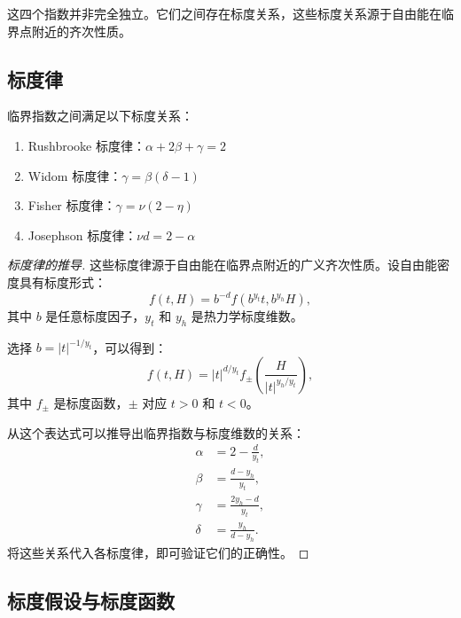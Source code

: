 \begin{remark}
这四个指数并非完全独立。它们之间存在标度关系，这些标度关系源于自由能在临界点附近的齐次性质。
\end{remark}

\subsection{标度律}

\begin{theorem}[四大标度律]
临界指数之间满足以下标度关系：
\begin{enumerate}
    \item Rushbrooke 标度律：$\alpha + 2\beta + \gamma = 2$
    \item Widom 标度律：$\gamma = \beta(\delta - 1)$
    \item Fisher 标度律：$\gamma = \nu(2 - \eta)$
    \item Josephson 标度律：$\nu d = 2 - \alpha$
\end{enumerate}
\end{theorem}

\begin{proof}[标度律的推导]
这些标度律源于自由能在临界点附近的广义齐次性质。设自由能密度具有标度形式：
\begin{equation}
    f(t, H) = b^{-d} f(b^{y_t} t, b^{y_h} H),
\end{equation}
其中 $b$ 是任意标度因子，$y_t$ 和 $y_h$ 是热力学标度维数。

选择 $b = |t|^{-1/y_t}$，可以得到：
\begin{equation}
    f(t, H) = |t|^{d/y_t} f_{\pm}\left(\frac{H}{|t|^{y_h/y_t}}\right),
\end{equation}
其中 $f_{\pm}$ 是标度函数，$\pm$ 对应 $t > 0$ 和 $t < 0$。

从这个表达式可以推导出临界指数与标度维数的关系：
\begin{align}
    \alpha &= 2 - \frac{d}{y_t}, \\
    \beta &= \frac{d - y_h}{y_t}, \\
    \gamma &= \frac{2y_h - d}{y_t}, \\
    \delta &= \frac{y_h}{d - y_h}.
\end{align}
将这些关系代入各标度律，即可验证它们的正确性。
\end{proof}

\subsection{标度假设与标度函数}

